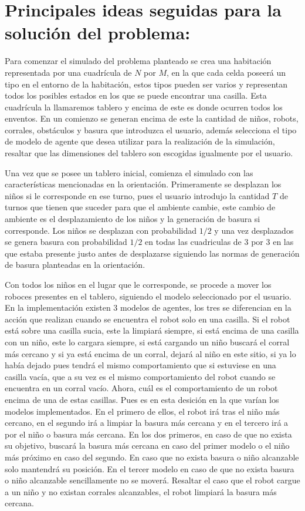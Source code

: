 \documentclass[titlepage,11pt]{scrartcl}
\begin{document}
\section{Principales ideas seguidas para la solución del problema:}
Para comenzar el simulado del problema planteado se crea una habitación representada por una cuadrícula de $N$ por $M$, en la que cada celda poseerá un tipo en el entorno de la habitación, estos tipos pueden ser varios y representan todos los posibles estados en los que se puede encontrar una casilla. Esta cuadrícula la llamaremos tablero y encima de este es donde ocurren todos los enventos. En un comienzo se generan encima de este la cantidad de niños, robots, corrales, obstáculos y basura que introduzca el usuario, además selecciona el tipo de modelo de agente que desea utilizar para la realización de la simulación, resaltar que las dimensiones del tablero son escogidas igualmente por el usuario.

Una vez que se posee un tablero inicial, comienza el simulado con las características mencionadas en la orientación. Primeramente se desplazan los niños si le corresponde en ese turno, pues el usuario introdujo la cantidad $T$ de turnos que tienen que suceder para que el ambiente cambie, este cambio de ambiente es el desplazamiento de los niños y la generación de basura si corresponde. Los niños se desplazan con probabilidad $1/2$ y una vez desplazados se genera basura con probabilidad $1/2$ en todas las cuadriculas de $3$ por $3$ en las que estaba presente justo antes de desplazarse siguiendo las normas de generación de basura planteadas en la orientación.

Con todos los niños en el lugar que le corresponde, se procede a mover los roboces presentes en el tablero, siguiendo el modelo seleccionado por el usuario. En la implementación existen 3 modelos de agentes, los tres se diferencian en la acción que realizan cuando se encuentra el robot solo en una casilla. Si el robot está sobre una casilla sucia, este la limpiará siempre, si está encima de una casilla con un niño, este lo cargara siempre, si está cargando un niño buscará el corral más cercano y si ya está encima de un corral, dejará al niño en este sitio, si ya lo había dejado pues tendrá el mismo comportamiento que si estuviese en una casilla vacía, que a su vez es el mismo comportamiento del robot cuando se encuentra en un corral vacío. Ahora, cuál es el comportamiento de un robot encima de una de estas casillas. Pues es en esta desición en la que varían los modelos implementados. En el primero de ellos, el robot irá tras el niño más cercano, en el segundo irá a limpiar la basura más cercana y en el tercero irá a por el niño o basura más cercana. En los dos primeros, en caso de que no exista su objetivo, buscará la basura más cercana en caso del primer modelo o el niño más próximo en caso del segundo. En caso que no exista basura o niño alcanzable solo mantendrá su posición. En el tercer modelo en caso de que no exista basura o niño alcanzable sencillamente no se moverá. Resaltar el caso que el robot cargue a un niño y no existan corrales alcanzables, el robot limpiará la basura más cercana.
\end{document}
